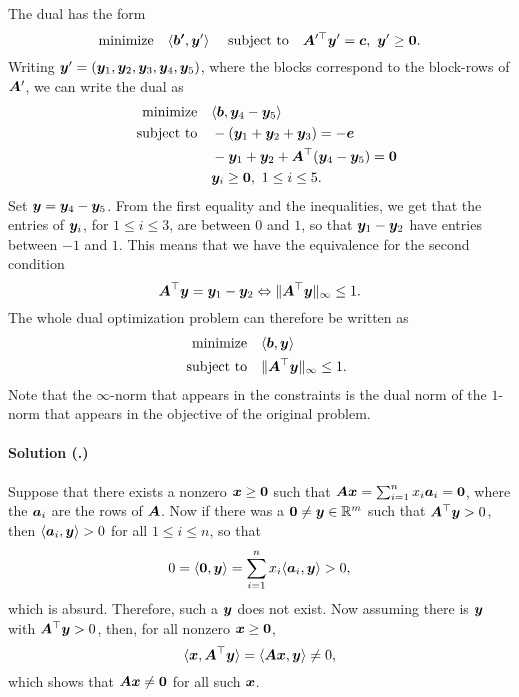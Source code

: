 \documentclass{article}
\newcounter{problemSheetNumber}
\newcounter{problems}
\renewcommand{\solution}[1]{\paragraph{Solution (\theproblemSheetNumber.\theproblems)}\addtocounter{problems}{1}\label{#1}}
\begin{document}
The dual has the form
\begin{equation*}
 \minimize \ip{\vct{b'}}{\vct{y}'} \ \subjto \mtx{A}'^{\trans}\vct{y}' =\vct{c}, \ \vct{y}'\geq \zerovct.
\end{equation*}
Writing $\bm{y}'=(\bm{y}_1,\bm{y}_2,\bm{y}_3,\bm{y}_4,\bm{y}_5)$, where the blocks correspond to the block-rows of $\bm{A}'$, we can write the dual as
\begin{align*}
 \text{minimize}\quad & \langle {\bm{b}}, {\bm{y}_4-\bm{y}_5} \rangle\\
 \quad\text{subject to}\quad & -(\bm{y}_1+\bm{y}_2+\bm{y}_3) = -\bm{e}\\
 & -\bm{y}_1+\bm{y}_2 +\bm{A}^{\top}(\bm{y}_4-\bm{y}_5) = \bm{0}\\
 & \bm{y}_i\geq \bm{0}, \ 1\leq i\leq 5.
\end{align*}
Set $\bm{y}=\bm{y}_4-\bm{y}_5$. From the first equality and the inequalities, we get that the entries of $\bm{y}_i$, for $1\leq i\leq 3$, are between $0$ and $1$, so that $\bm{y}_1-\bm{y}_2$ have entries between $-1$ and $1$. This means that we have the equivalence for the second condition
\begin{equation*}
 \bm{A}^{\top}\bm{y} = \bm{y}_1-\bm{y}_2 \Leftrightarrow \Vert {\bm{A}^{\top}\bm{y}}\Vert_\infty \leq 1. 
\end{equation*}
The whole dual optimization problem can therefore be written as
\begin{align*}
 \text{minimize}\quad & \langle {\bm{b}}, {\bm{y}} \rangle\\
 \quad\text{subject to}\quad & \Vert {\bm{A}^{\top}\bm{y}}\Vert_\infty\leq 1.
\end{align*}
Note that the $\infty$-norm that appears in the constraints is the dual norm of the $1$-norm that appears in the objective of the original problem.

\solution{pr:4} Suppose that there exists a nonzero $\bm{x}\geq \bm{0}$ such that $\bm{A}\bm{x}=\sum_{i=1}^n x_i\bm{a}_i=\bm{0}$, where the $\bm{a}_i$ are the rows of $\bm{A}$. Now if there was a $\bm{0}\neq \bm{y}\in \mathbb{R}^m$ such that $\bm{A}^{\top}\bm{y}>0$, then $\langle {\bm{a}_i}, {\bm{y}} \rangle>0$ for all $1\leq i\leq n$, so that
\begin{equation*}
 0 =\langle {\bm{0}}, {\bm{y}} \rangle = \sum_{i=1}^n x_i \langle {\bm{a}_i}, {\bm{y}} \rangle >0,
\end{equation*}
which is absurd. Therefore, such a $\bm{y}$ does not exist. Now assuming there is $\bm{y}$ with $\bm{A}^{\top}\bm{y}>0$, then, for all nonzero $\bm{x}\geq \bm{0}$,
\begin{equation*}
 \langle {\bm{x}}, {\bm{A}^{\top}\bm{y}} \rangle = \langle {\bm{A}\bm{x}}, {\bm{y}} \rangle \neq 0, 
\end{equation*}
which shows that $\bm{A}\bm{x}\neq \bm{0}$ for all such $\bm{x}$. 
\end{document}
